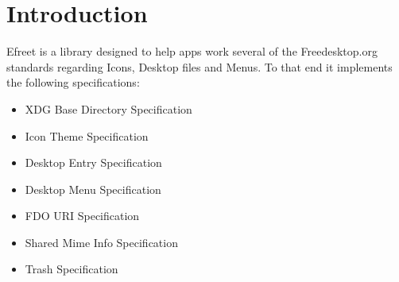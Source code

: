 \section{Introduction}\label{index_intro}
Efreet is a library designed to help apps work several of the Freedesktop.org standards regarding Icons, Desktop files and Menus. To that end it implements the following specifications:

\begin{itemize}
\item XDG Base Directory Specification \item Icon Theme Specification \item Desktop Entry Specification \item Desktop Menu Specification \item FDO URI Specification \item Shared Mime Info Specification \item Trash Specification \end{itemize}
